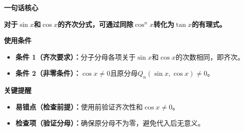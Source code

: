 \begin{summarybox}
	\textbf{\textcolor{CSummary}{一句话核心}}

	\textbf{对于$\sin x$和$\cos x$的齐次分式，可通过同除$\cos^n x$转化为$\tan x$的有理式。}

	\medskip
	\textbf{\textcolor{CSummary}{使用条件}}
	\begin{itemize}[leftmargin=*, itemsep=0.5em, topsep=0.4em]
		\item \textbf{条件 1（齐次要求）：}分子分母各项关于$\sin x$和$\cos x$的次数相同，即齐次。
		\item \textbf{条件 2（非零条件）：}$\cos x\neq0$且原分母$Q_n(\sin x,\cos x)\neq0$。
	\end{itemize}

	\medskip
	\textbf{\textcolor{CSummary}{关键提醒}}
	\begin{itemize}[leftmargin=*, itemsep=0.5em, topsep=0.4em]
		\item \textbf{易错点（检查前提）：}使用前验证齐次性和$\cos x\neq0$。
		\item \textbf{检查项（验证分母）：}确保原分母不为零，避免代入后无意义。
	\end{itemize}
\end{summarybox}

